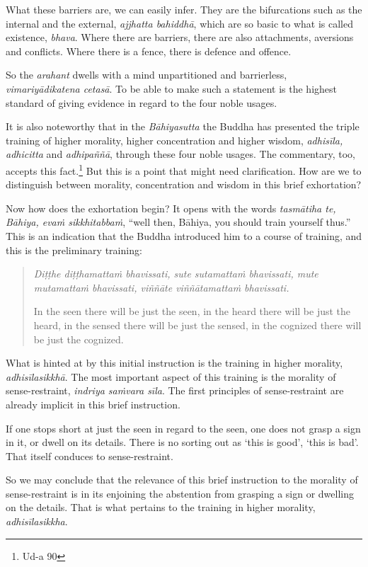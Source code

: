 What these barriers are, we can easily infer. They are the bifurcations such as the internal and the external, \emph{ajjhatta bahiddhā}, which are so basic to what is called existence, \emph{bhava}. Where there are barriers, there are also attachments, aversions and conflicts. Where there is a fence, there is defence and offence.

So the \emph{arahant} dwells with a mind unpartitioned and barrierless, \emph{vimariyādikatena cetasā}. To be able to make such a statement is the highest standard of giving evidence in regard to the four noble usages.

It is also noteworthy that in the \emph{Bāhiyasutta} the Buddha has presented the triple training of higher morality, higher concentration and higher wisdom, \emph{adhisīla, adhicitta} and \emph{adhipaññā}, through these four noble usages. The commentary, too, accepts this fact.\footnote{Ud-a 90} But this is a point that might need clarification. How are we to distinguish between morality, concentration and wisdom in this brief exhortation?

Now how does the exhortation begin? It opens with the words \emph{tasmātiha te, Bāhiya, evaṁ sikkhitabbaṁ}, ``well then, Bāhiya, you should train yourself thus.'' This is an indication that the Buddha introduced him to a course of training, and this is the preliminary training:

\begin{quote}
\emph{Diṭṭhe diṭṭhamattaṁ bhavissati, sute sutamattaṁ bhavissati, mute mutamattaṁ bhavissati, viññāte viññātamattaṁ bhavissati.}

In the seen there will be just the seen, in the heard there will be just the heard, in the sensed there will be just the sensed, in the cognized there will be just the cognized.
\end{quote}

What is hinted at by this initial instruction is the training in higher morality, \emph{adhisīlasikkhā}. The most important aspect of this training is the morality of sense-restraint, \emph{indriya saṁvara sīla}. The first principles of sense-restraint are already implicit in this brief instruction.

If one stops short at just the seen in regard to the seen, one does not grasp a sign in it, or dwell on its details. There is no sorting out as `this is good', `this is bad'. That itself conduces to sense-restraint.

So we may conclude that the relevance of this brief instruction to the morality of sense-restraint is in its enjoining the abstention from grasping a sign or dwelling on the details. That is what pertains to the training in higher morality, \emph{adhisīlasikkha}.

